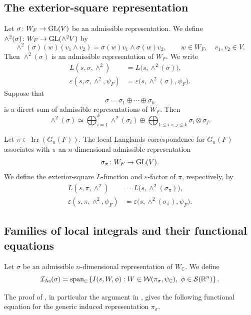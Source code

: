\documentclass[12pt,reqno]{amsart}
\numberwithin{equation}{section}%
\numberwithin{equation}{subsection}
\theoremstyle{definition}
\theoremstyle{remark}
\begin{document}
\subsection{The exterior-square representation}

Let $\sigma\colon W_F\to{\rm GL}(V)$ be an admissible representation. We define
$\wedge^2(\sigma)\colon W_F\to{\rm GL}(\wedge^2V)$ by
\[
\wedge^2(\sigma)(w)(v_1\wedge v_2)
=
\sigma(w)v_1\wedge\sigma(w)v_2,
\qquad w\in W_F,\quad v_1,v_2\in V.
\]
Then $\wedge^2(\sigma)$ is an admissible representation of $W_F$. We write
\[
\begin{aligned}
L(s,\sigma,\wedge^2)
&=L\bigl(s,\wedge^2(\sigma)\bigr),\\
\varepsilon(s,\sigma,\wedge^2,\psi_F)
&=\varepsilon\bigl(s,\wedge^2(\sigma),\psi_F\bigr).
\end{aligned}
\]
Suppose that
\[
\sigma=\sigma_1\oplus\cdots\oplus\sigma_k
\]
is a direct sum of admissible representations of $W_F$. Then
\[
\wedge^2(\sigma)
\simeq
\bigoplus_{i=1}^k\wedge^2(\sigma_i)
\oplus
\bigoplus_{1\leq i<j\leq k}
\sigma_i\otimes\sigma_j.
\]

Let $\pi\in\operatorname{Irr}(G_n(F))$. The local Langlands
correspondence for $G_n(F)$ \cite[Theorems~2 and~5]{Kna1994} associates with $\pi$ an
$n$-dimensional admissible representation
\[
\sigma_\pi\colon W_F\to{\rm GL}(V).
\]
We define the exterior-square \(L\)-function and \(\varepsilon\)-factor of
\(\pi\), respectively, by
\[
\begin{aligned}
L(s,\pi,\wedge^2)
&=L\bigl(s,\wedge^2(\sigma_\pi)\bigr),\\
\varepsilon(s,\pi,\wedge^2,\psi_F)
&=\varepsilon\bigl(s,\wedge^2(\sigma_\pi),\psi_F\bigr).
\end{aligned}
\]
\subsection{Families of local integrals and their functional equations}

Let \(\sigma\) be an admissible \(n\)-dimensional representation of
\(W_{\mathbb{C}}\). We define
\[
\mathcal{I}_{{\rm As}}(\sigma)
=
\operatorname{span}_{\mathbb{C}}
\left\{
I(s,W,\phi):
W\in\mathcal{W}(\pi_\sigma,\psi_{\mathbb{C}}),\
\phi\in\mathcal{S}(\mathbb{R}^n)
\right\}.
\]

The proof of \cite[Theorem~1(i),(ii)]{BP2021}, in particular the
argument in \cite[Section~3.10]{BP2021}, gives the following functional
equation for the generic induced representation \(\pi_\sigma\).
\end{document}
